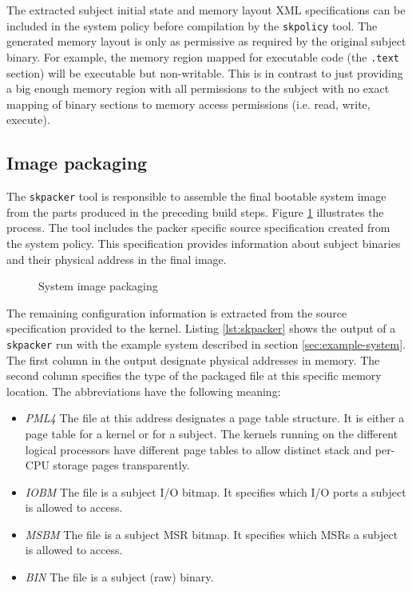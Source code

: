 The extracted subject initial state and memory layout XML specifications can be
included in the system policy before compilation by the \texttt{skpolicy} tool.
The generated memory layout is only as permissive as required by the original
subject binary. For example, the memory region mapped for executable code
(the \texttt{.text} section) will be executable but non-writable. This is in
contrast to just providing a big enough memory region with all permissions to
the subject with no exact mapping of binary sections to memory access
permissions (i.e. read, write, execute).

\subsection{Image packaging}\label{subsec:image-packaging}
The \texttt{skpacker} tool is responsible to assemble the final bootable system
image from the parts produced in the preceding build steps. Figure
\ref{fig:image-packaging} illustrates the process. The tool includes the packer
specific source specification created from the system policy. This specification
provides information about subject binaries and their physical address in the
final image.

\begin{figure}[h]
	\centering
	
	\caption{System image packaging}
	\label{fig:image-packaging}
\end{figure}

The remaining configuration information is extracted from the source
specification provided to the kernel. Listing \ref{lst:skpacker} shows the
output of a \texttt{skpacker} run with the example system described in section
\ref{sec:example-system}. The first column in the output designate physical
addresses in memory. The second column specifies the type of the packaged file
at this specific memory location. The abbreviations have the following meaning:

\begin{itemize}
	\item \emph{PML4} The file at this address designates a page table
		structure. It is either a page table for a kernel or for a subject. The
		kernels running on the different logical processors have different page
		tables to allow distinct stack and per-CPU storage pages transparently.
	\item \emph{IOBM} The file is a subject I/O bitmap. It specifies which I/O
		ports a subject is allowed to access.
	\item \emph{MSBM} The file is a subject MSR bitmap. It specifies which MSRs
		a subject is allowed to access.
	\item \emph{BIN} The file is a subject (raw) binary.
\end{itemize}

